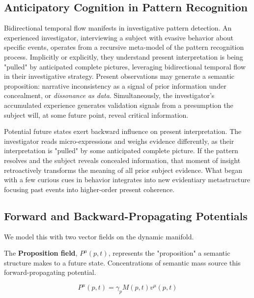 \subsection{Anticipatory Cognition in Pattern Recognition}
\label{9.6.1:anticipatory_cognition_in_pattern_recognition}

Bidirectional temporal flow manifests in investigative pattern detection. An experienced investigator, interviewing a subject with evasive behavior about specific events, operates from a recursive meta-model of the pattern recognition process. Implicitly or explicitly, they understand present interpretation is being "pulled" by anticipated complete pictures, leveraging bidirectional temporal flow in their investigative strategy. Present observations may generate a semantic proposition: narrative inconsistency as a signal of prior information under concealment, or \textit{dissonance as data}. Simultaneously, the investigator's accumulated experience generates validation signals from a presumption the subject will, at some future point, reveal critical information.

Potential future states exert backward influence on present interpretation. The investigator reads micro-expressions and weighs evidence differently, as their interpretation is "pulled" by some anticipated complete picture. If the pattern resolves and the subject reveals concealed information, that moment of insight retroactively transforms the meaning of all prior subject evidence. What began with a few curious cues in behavior integrates into new evidentiary metastructure focusing past events into higher-order present coherence.


\subsection{Forward and Backward-Propagating Potentials}
\label{9.6.2:forward_and_backward_propagating_potentials}

We model this with two vector fields on the dynamic manifold.

The \textbf{Proposition field}, \(P^\mu(p,t)\), represents the "proposition" a semantic structure makes to a future state. Concentrations of semantic mass source this forward-propagating potential.

\begin{equation}
P^\mu(p,t) = \gamma_p M(p,t) v^\mu(p,t)
\end{equation}

